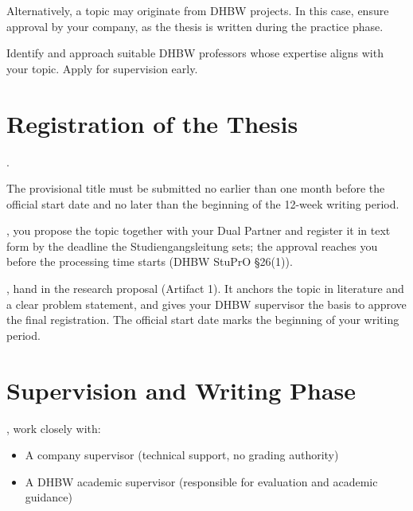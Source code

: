 \documentclass{../sharedAssets/tufte}
\begin{document}
Alternatively, a topic may originate from DHBW projects.
In this case, ensure approval by your company, as the thesis is written during the
practice phase.

Identify and approach suitable DHBW professors whose expertise aligns with your topic.
Apply for supervision early.

\section{Registration of the Thesis}
. 

The provisional title must be submitted no earlier than one month before the official
start date and no later than the beginning of the 12-week writing period.

, you propose the topic together with your Dual Partner and register
it in text form by the deadline the Studiengangsleitung sets; the approval reaches you
before the processing time starts (DHBW StuPrO \S26(1)).

, hand in the research proposal
(Artifact 1).
It anchors the topic in literature and a clear problem statement, and gives your DHBW
supervisor the basis to approve the final registration.
The official start date marks the beginning of your writing period.

\section{Supervision and Writing Phase}
, work closely with:
\begin{itemize}
    \item A company supervisor (technical support, no grading authority)
    \item A DHBW academic supervisor (responsible for evaluation and academic guidance)
\end{itemize}
\end{document}
